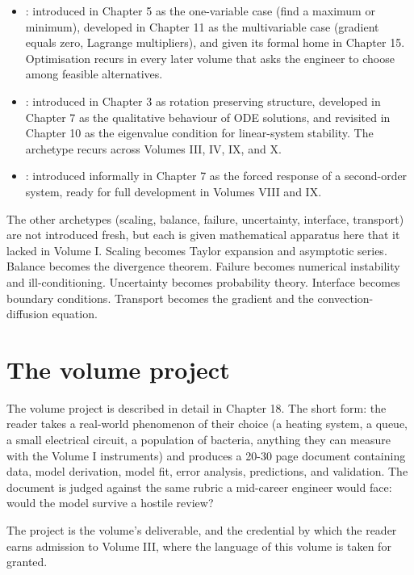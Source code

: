 \begin{itemize}[leftmargin=*]
  \item {}: introduced in Chapter 5 as the
    one-variable case (find a maximum or minimum), developed in
    Chapter 11 as the multivariable case (gradient equals zero,
    Lagrange multipliers), and given its formal home in Chapter 15.
    Optimisation recurs in every later volume that asks the
    engineer to choose among feasible alternatives.
  \item {}: introduced in Chapter 3 as rotation
    preserving structure, developed in Chapter 7 as the qualitative
    behaviour of ODE solutions, and revisited in Chapter 10 as the
    eigenvalue condition for linear-system stability. The archetype
    recurs across Volumes III, IV, IX, and X.
  \item {}: introduced informally in Chapter 7 as
    the forced response of a second-order system, ready for full
    development in Volumes VIII and IX.
\end{itemize}

The other archetypes (scaling, balance, failure, uncertainty, interface, transport) are not introduced fresh, but each is given mathematical apparatus here that it lacked in Volume I. Scaling becomes Taylor expansion and asymptotic series. Balance becomes the divergence theorem. Failure becomes numerical instability and ill-conditioning. Uncertainty becomes probability theory. Interface becomes boundary conditions. Transport becomes the gradient and the convection-diffusion equation.

\section*{The volume project}

The volume project is described in detail in Chapter 18. The short form: the reader takes a real-world phenomenon of their choice (a heating system, a queue, a small electrical circuit, a population of bacteria, anything they can measure with the Volume I instruments) and produces a 20-30 page document containing data, model derivation, model fit, error analysis, predictions, and validation. The document is judged against the same rubric a mid-career engineer would face: would the model survive a hostile review?

The project is the volume's deliverable, and the credential by which the reader earns admission to Volume III, where the language of this volume is taken for granted.


